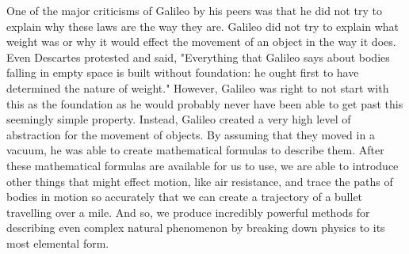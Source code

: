 \documentclass[10pt]{article}
\begin{document}
\begin{doublespace}
One of the major criticisms of Galileo by his peers was that he did not try to explain why these laws are the way they are. Galileo did not try to explain what weight was or why it would effect the movement of an object in the way it does. Even Descartes protested and said, "Everything that Galileo says about bodies falling in empty space is built without foundation: he ought first to have determined the nature of weight." However, Galileo was right to not start with this as the foundation as he would probably never have been able to get past this seemingly simple property. Instead, Galileo created a very high level of abstraction for the movement of objects. By assuming that they moved in a vacuum, he was able to create mathematical formulas to describe them. After these mathematical formulas are available for us to use, we are able to introduce other things that might effect motion, like air resistance, and trace the paths of bodies in motion so accurately that we can create a trajectory of a bullet travelling over a mile. And so, we produce incredibly powerful methods for describing even complex natural phenomenon by breaking down physics to its most elemental form.



\end{doublespace}
\end{document}
